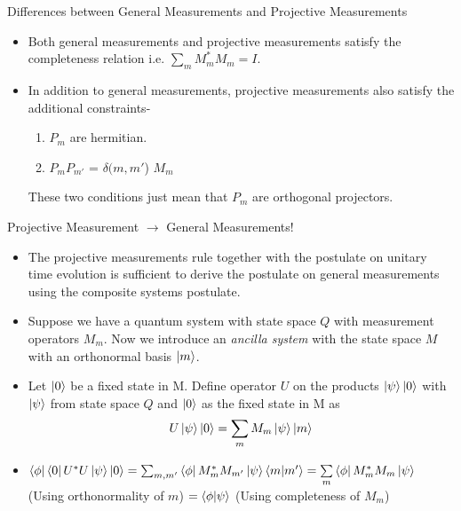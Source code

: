 \documentclass[handout]{beamer}
\begin{document}
\begin{frame}{Differences between General Measurements and Projective Measurements}
\begin{itemize}
\item Both general measurements and projective measurements satisfy the completeness relation i.e. $\sum_m M_m^*M_m = I$. \pause
\item In addition to general measurements, projective measurements also satisfy the additional constraints-\pause
    \begin{enumerate}
        \item $P_m$ are hermitian.\pause
        \item $P_m P_{m'}$ = $\delta(m, m'$) $M_m$\pause
    \end{enumerate}
These two conditions just mean that $P_m$ are orthogonal projectors.
\end{itemize}
\end{frame}

\begin{frame}{Projective Measurement $
\to$ General Measurements!}
\begin{itemize}
    \item The projective measurements rule together with the postulate on unitary time evolution is sufficient to derive the postulate on general measurements using the composite systems postulate.\pause 
    \item Suppose we have a quantum system with state space $Q$ with measurement operators $M_m$. Now we introduce an \textit{ancilla system} with the state space $M$ with an orthonormal basis $\ket{m}$.\pause 
    \item Let $\ket{0}$ be a fixed state in M. Define operator $U$ on the products $\ket{\psi}\ket{0}$ with $\ket{\psi}$ from state space $Q$ and $\ket{0}$ as the fixed state in M as \[ U\ket{\psi}\ket{0} = \sum_m M_m \ket{\psi}\ket{m} \]\pause 
    \item $\bra{\phi}\bra{0}U^* U \ket{\psi}\ket{0} = \sum_{m,m'} \bra{\phi} M_m^* M_{m'} \ket{\psi} \bra{m}\ket{m'} = \sum\limits_m \bra{\phi} M_m^* M_m \ket{\psi}
$ (Using orthonormality of $m$) $= \bra{\phi}\ket{\psi}$ (Using completeness of $M_m$)
\end{itemize}
\end{frame}
\end{document}

